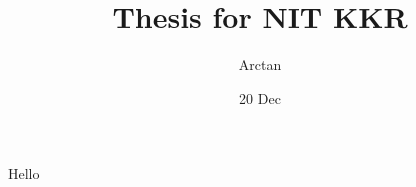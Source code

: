 \documentclass{report}
\title{Thesis for \Large{NIT KKR}}
\author{Arctan}
\date{20 Dec}
\begin{document}
\maketitle    
Hello
\end{document}
